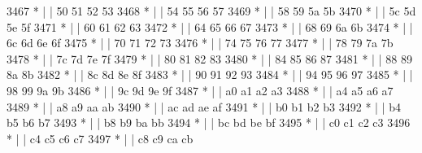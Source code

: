 \begin{DoxyCode}
3467 \textcolor{comment}{         * |    |                           50  51  52  53}
3468 \textcolor{comment}{         * |    |                           54  55  56  57}
3469 \textcolor{comment}{         * |    |                           58  59  5a  5b}
3470 \textcolor{comment}{         * |    |                           5c  5d  5e  5f}
3471 \textcolor{comment}{         * |    |                           60  61  62  63}
3472 \textcolor{comment}{         * |    |                           64  65  66  67}
3473 \textcolor{comment}{         * |    |                           68  69  6a  6b}
3474 \textcolor{comment}{         * |    |                           6c  6d  6e  6f}
3475 \textcolor{comment}{         * |    |                           70  71  72  73}
3476 \textcolor{comment}{         * |    |                           74  75  76  77}
3477 \textcolor{comment}{         * |    |                           78  79  7a  7b}
3478 \textcolor{comment}{         * |    |                           7c  7d  7e  7f}
3479 \textcolor{comment}{         * |    |                           80  81  82  83}
3480 \textcolor{comment}{         * |    |                           84  85  86  87}
3481 \textcolor{comment}{         * |    |                           88  89  8a  8b}
3482 \textcolor{comment}{         * |    |                           8c  8d  8e  8f}
3483 \textcolor{comment}{         * |    |                           90  91  92  93}
3484 \textcolor{comment}{         * |    |                           94  95  96  97}
3485 \textcolor{comment}{         * |    |                           98  99  9a  9b}
3486 \textcolor{comment}{         * |    |                           9c  9d  9e  9f}
3487 \textcolor{comment}{         * |    |                           a0  a1  a2  a3}
3488 \textcolor{comment}{         * |    |                           a4  a5  a6  a7}
3489 \textcolor{comment}{         * |    |                           a8  a9  aa  ab}
3490 \textcolor{comment}{         * |    |                           ac  ad  ae  af}
3491 \textcolor{comment}{         * |    |                           b0  b1  b2  b3}
3492 \textcolor{comment}{         * |    |                           b4  b5  b6  b7}
3493 \textcolor{comment}{         * |    |                           b8  b9  ba  bb}
3494 \textcolor{comment}{         * |    |                           bc  bd  be  bf}
3495 \textcolor{comment}{         * |    |                           c0  c1  c2  c3}
3496 \textcolor{comment}{         * |    |                           c4  c5  c6  c7}
3497 \textcolor{comment}{         * |    |                           c8  c9  ca  cb}

\end{DoxyCode}
